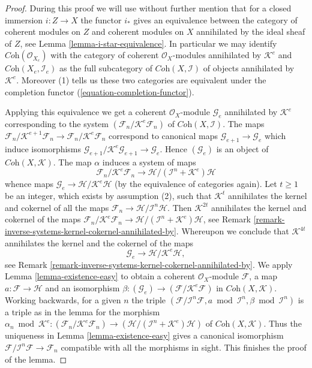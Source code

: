 \documentclass[10pt,a4paper]{amsart}
\theoremstyle{plain}
\theoremstyle{definition}
\theoremstyle{remark}
\numberwithin{equation}{subsection}
\begin{document}
\begin{proof}
During this proof we will use without further mention that for a closed
immersion $i : Z \to X$ the functor $i_*$ gives an equivalence between the
category of coherent modules on $Z$ and coherent modules on $X$ annihilated
by the ideal sheaf of $Z$, see Lemma \ref{lemma-i-star-equivalence}.
In particular we may identify $\textit{Coh}(\mathcal{O}_{X_e})$
with the category of coherent $\mathcal{O}_X$-modules annihilated by
$\mathcal{K}^e$ and $\textit{Coh}(X_e, \mathcal{I}_e)$ as the full subcategory
of $\textit{Coh}(X, \mathcal{I})$ of objects annihilated by $\mathcal{K}^e$.
Moreover (1) tells us these two categories are equivalent under the
completion functor (\ref{equation-completion-functor}).

\medskip\noindent
Applying this equivalence we get a coherent $\mathcal{O}_X$-module
$\mathcal{G}_e$ annihilated by $\mathcal{K}^e$ corresponding to the system
$(\mathcal{F}_n/\mathcal{K}^e\mathcal{F}_n)$ of
$\textit{Coh}(X, \mathcal{I})$. The maps
$\mathcal{F}_n/\mathcal{K}^{e + 1}\mathcal{F}_n \to
\mathcal{F}_n/\mathcal{K}^e\mathcal{F}_n$ correspond to canonical maps
$\mathcal{G}_{e + 1} \to \mathcal{G}_e$ which induce isomorphisms
$\mathcal{G}_{e + 1}/\mathcal{K}^e\mathcal{G}_{e + 1} \to \mathcal{G}_e$.
Hence $(\mathcal{G}_e)$ is an object of $\textit{Coh}(X, \mathcal{K})$.
The map $\alpha$ induces a system of maps
$$
\mathcal{F}_n/\mathcal{K}^e\mathcal{F}_n
\longrightarrow
\mathcal{H}/(\mathcal{I}^n + \mathcal{K}^e)\mathcal{H}
$$
whence maps $\mathcal{G}_e \to \mathcal{H}/\mathcal{K}^e\mathcal{H}$
(by the equivalence of categories again).
Let $t \geq 1$ be an integer, which exists by assumption (2),
such that $\mathcal{K}^t$ annihilates the kernel and cokernel of all the maps
$\mathcal{F}_n \to \mathcal{H}/\mathcal{I}^n\mathcal{H}$.
Then $\mathcal{K}^{2t}$ annihilates the kernel and cokernel of the maps
$\mathcal{F}_n/\mathcal{K}^e\mathcal{F}_n \to
\mathcal{H}/(\mathcal{I}^n + \mathcal{K}^e)\mathcal{H}$, see
Remark \ref{remark-inverse-systems-kernel-cokernel-annihilated-by}.
Whereupon we conclude that $\mathcal{K}^{4t}$ annihilates the kernel and
the cokernel of the maps
$$
\mathcal{G}_e
\longrightarrow
\mathcal{H}/\mathcal{K}^e\mathcal{H},
$$
see Remark \ref{remark-inverse-systems-kernel-cokernel-annihilated-by}.
We apply Lemma \ref{lemma-existence-easy} to obtain a coherent
$\mathcal{O}_X$-module $\mathcal{F}$, a map
$a : \mathcal{F} \to \mathcal{H}$ and an isomorphism
$\beta : (\mathcal{G}_e) \to (\mathcal{F}/\mathcal{K}^e\mathcal{F})$
in $\textit{Coh}(X, \mathcal{K})$. Working backwards, for a given $n$
the triple
$(\mathcal{F}/\mathcal{I}^n\mathcal{F}, a \bmod \mathcal{I}^n, \beta
\bmod \mathcal{I}^n)$ is a triple as in the lemma for the morphism
$\alpha_n \bmod \mathcal{K}^e :
(\mathcal{F}_n/\mathcal{K}^e\mathcal{F}_n) \to
(\mathcal{H}/(\mathcal{I}^n + \mathcal{K}^e)\mathcal{H})$
of $\textit{Coh}(X, \mathcal{K})$. Thus the uniqueness in
Lemma \ref{lemma-existence-easy}
gives a canonical isomorphism
$\mathcal{F}/\mathcal{I}^n\mathcal{F} \to \mathcal{F}_n$
compatible with all the morphisms in sight. This finishes the proof
of the lemma.
\end{proof}
\end{document}
